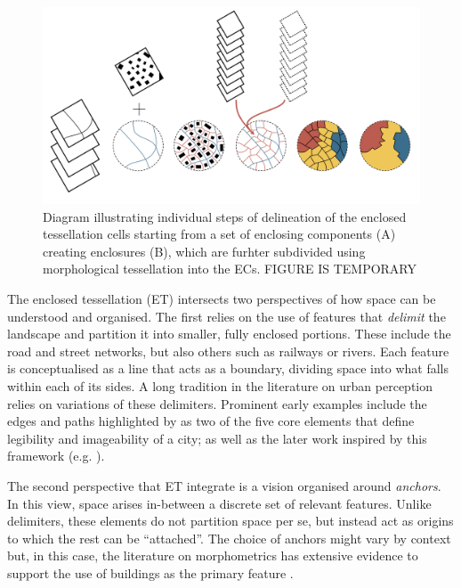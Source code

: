 \begin{figure}
        \includegraphics[width=\linewidth]{figures/tessellation.png}
        \caption{Diagram illustrating individual steps of delineation of the enclosed
        tessellation cells starting from a set of enclosing components (A) creating
        enclosures (B), which are furhter subdivided using morphological tessellation
        into the ECs. FIGURE IS TEMPORARY}
        \label{fig:tessellation}
\end{figure}

The enclosed tessellation (ET) intersects two perspectives of how space can be
understood and organised.
%
The first relies on the use of features that \textit{delimit} the landscape and
partition it into smaller, fully enclosed portions. These include the road and
street networks, but also others such as railways or rivers. Each feature is
conceptualised as a line that acts as a boundary, dividing space into what falls
within each of its sides.
%
A long tradition in the literature on urban perception relies on
variations of these delimiters. Prominent
early examples include the edges and paths highlighted by \cite{lynch1960} as
two of the five core elements that define legibility and imageability of a city; 
as well as the later work inspired by this framework (e.g. \citealp{filomena2019a}).

The second perspective that ET integrate is a vision organised around
\textit{anchors}. In this view, space arises in-between
a discrete set of relevant features. Unlike delimiters, these elements do not
partition space per se, but instead act as origins to which the rest can be
``attached''.
%
The choice of anchors might vary by context but, in this case, the literature on
morphometrics has extensive evidence to support the use of buildings as the
primary feature \citep{hamaina2012a, usui2013estimation, schirmer2015}.

